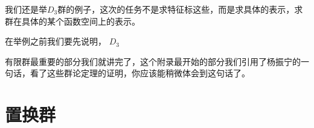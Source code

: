 \begin{figure}[h]
	\begin{floatrow}[2]
	\end{floatrow}
\end{figure}

我们还是举$D_3$群的例子，这次的任务不是求特征标这些，而是求具体的表示，求群在具体的某个函数空间上的表示。

在举例之前我们要先说明，
$D_3$

有限群最重要的部分我们就讲完了，这个附录最开始的部分我们引用了杨振宁的一句话，看了这些群论定理的证明，你应该能稍微体会到这句话了。

\section{置换群}